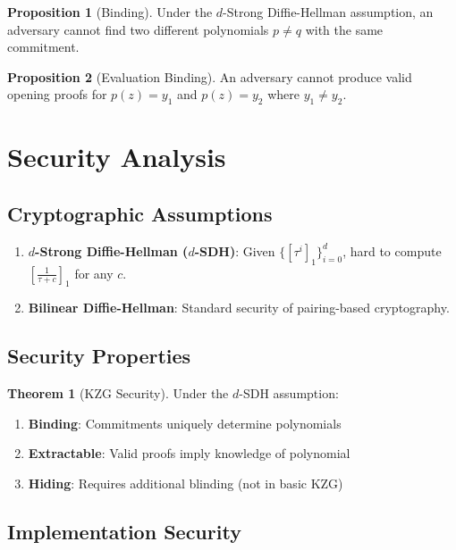 \documentclass[11pt,a4paper]{article}
\theoremstyle{definition}
\newtheorem{theorem}{Theorem}
\newtheorem{proposition}{Proposition}
\begin{document}
\begin{proposition}[Binding]
    Under the $d$-Strong Diffie-Hellman assumption, an adversary cannot find two different polynomials $p \neq q$ with the same commitment.
\end{proposition}

\begin{proposition}[Evaluation Binding]
    An adversary cannot produce valid opening proofs for $p(z) = y_1$ and $p(z) = y_2$ where $y_1 \neq y_2$.
\end{proposition}

\section{Security Analysis}

\subsection{Cryptographic Assumptions}

\begin{enumerate}
    \item \textbf{$d$-Strong Diffie-Hellman ($d$-SDH)}: Given $\{[\tau^i]_1\}_{i=0}^{d}$, hard to compute $[\frac{1}{\tau + c}]_1$ for any $c$.
    \item \textbf{Bilinear Diffie-Hellman}: Standard security of pairing-based cryptography.
\end{enumerate}

\subsection{Security Properties}

\begin{theorem}[KZG Security]
    Under the $d$-SDH assumption:
    \begin{enumerate}
        \item \textbf{Binding}: Commitments uniquely determine polynomials
        \item \textbf{Extractable}: Valid proofs imply knowledge of polynomial
        \item \textbf{Hiding}: Requires additional blinding (not in basic KZG)
    \end{enumerate}
\end{theorem}

\subsection{Implementation Security}
\end{document}

